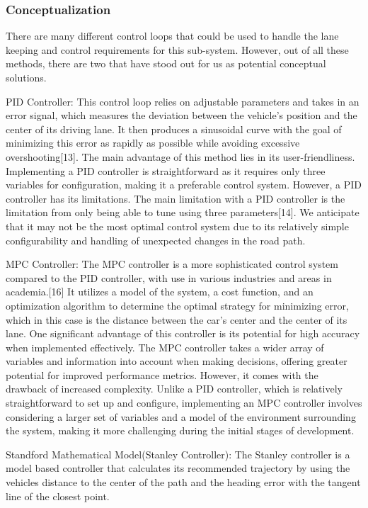 \documentclass[titlepage]{article}
\begin{document}
\subsubsection{Conceptualization}

There are many different control loops that could be used to handle the lane keeping and control requirements for this sub-system. However, out of all these methods, there are two that have stood out for us as potential conceptual solutions.

PID Controller:
This control loop relies on adjustable parameters and takes in an error signal, which measures the deviation between the vehicle's position and the center of its driving lane. It then produces a sinusoidal curve with the goal of minimizing this error as rapidly as possible while avoiding excessive overshooting[13]. The main advantage of this method lies in its user-friendliness. Implementing a PID controller is straightforward as it requires only three variables for configuration, making it a preferable control system. However, a PID controller has its limitations. The main limitation with a PID controller is the limitation from only being able to tune using three parameters[14]. We anticipate that it may not be the most optimal control system due to its relatively simple configurability and handling of unexpected changes in the road path.


MPC Controller:
The MPC controller is a more sophisticated control system compared to the PID controller, with use in various industries and areas in academia.[16] It utilizes a model of the system, a cost function, and an optimization algorithm to determine the optimal strategy for minimizing error, which in this case is the distance between the car’s center and the center of its lane. One significant advantage of this controller is its potential for high accuracy when implemented effectively. The MPC controller takes a wider array of variables and information into account when making decisions, offering greater potential for improved performance metrics. However, it comes with the drawback of increased complexity. Unlike a PID controller, which is relatively straightforward to set up and configure, implementing an MPC controller involves considering a larger set of variables and a model of the environment surrounding the system, making it more challenging during the initial stages of development.

Standford Mathematical Model(Stanley Controller):
The Stanley controller is a model based controller that calculates its recommended trajectory by using the vehicles distance to the center of the path and the heading error with the tangent line of the closest point.
\end{document}
